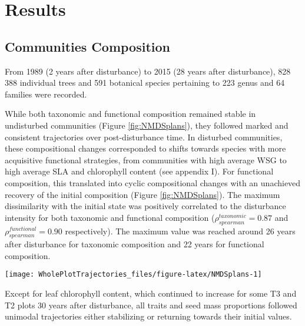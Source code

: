 \documentclass[fleqn,10pt]{ArtEcoFoG} %
\begin{document}
\section{Results}\label{results}

\subsection{Communities Composition}\label{communities-composition}

From 1989 (2 years after disturbance) to 2015 (28 years after
disturbance), 828 388 individual trees and 591 botanical species
pertaining to 223 genus and 64 families were recorded.

While both taxonomic and functional composition remained stable in
undisturbed communities (Figure \ref{fig:NMDSplans}), they followed
marked and consistent trajectories over post-disturbance time. In
disturbed communities, these compositional changes corresponded to
shifts towards species with more acquisitive functional strategies, from
communities with high average WSG to high average SLA and chlorophyll
content (see appendix I). For functional composition, this translated
into cyclic compositional changes with an unachieved recovery of the
initial composition (Figure \ref{fig:NMDSplans}). The maximum
dissimilarity with the initial state was positively correlated to the
disturbance intensity for both taxonomic and functional composition
(\(\rho_{spearman}^{taxonomic}=0.87\) and
\(\rho_{spearman}^{functional}=0.90\) respectively). The maximum value
was reached around 26 years after disturbance for taxonomic composition
and 22 years for functional composition.

\begin{figure*}

{\centering \texttt{[image: WholePlotTrajectories\_files/figure-latex/NMDSplans-1]} 

}

\caption{Plot trajectories in terms of flora composition (left panels \textbf{(a)} and \textbf{(c)}) and functional composition (right panels \textbf{(b)} and \textbf{(d)}) in a two-dimensional NMDS space. Lower panels (\textbf{(c)} and \textbf{(d)}) represent the euclidean distance to initial condition along the 30 sampled years. Colors are treatments: green (control), blue (T1), orange (T2), red (T3) with shaded areas the credibility intervals}\label{fig:NMDSplans}
\end{figure*}

Except for leaf chlorophyll content, which continued to increase for
some T3 and T2 plots 30 years after disturbance, all traits and seed
mass proportions followed unimodal trajectories either stabilizing or
returning towards their initial values.
\end{document}
